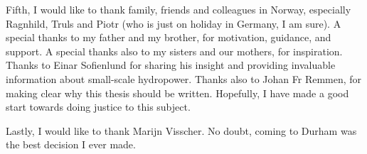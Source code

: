 \begin{quoting}
Fifth, I would like to thank family, friends and colleagues in Norway, especially Ragnhild, Truls and Piotr (who is just on holiday in Germany, I am sure). A special thanks to my father and my brother, for motivation, guidance, and support. A special thanks also to my sisters and our mothers, for inspiration. Thanks to Einar Sofienlund for sharing his insight and providing invaluable information about small-scale hydropower. Thanks also to Johan Fr Remmen, for making clear why this thesis should be written. Hopefully, I have made a good start towards doing justice to this subject.

Lastly, I would like to thank Marijn Visscher. No doubt, coming to Durham was the best decision I ever made.

\end{quoting}






